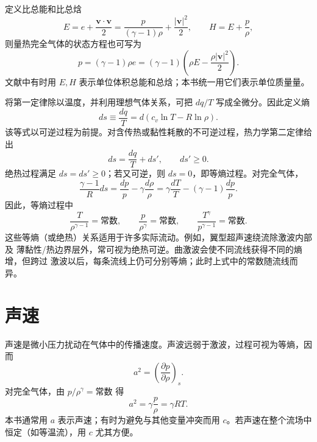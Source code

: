 \documentclass[11pt,a4paper,openany,fontset=none]{ctexbook}
\begin{document}
定义比总能和比总焓
\begin{equation}
 E=e+\frac{\bm v\cdot\bm v}{2}
   =\frac{p}{(\gamma-1)\rho}+\frac{\lvert\bm v\rvert^2}{2},
 \qquad H=E+\frac{p}{\rho},
\end{equation}
则量热完全气体的状态方程也可写为
\begin{equation}
 p=(\gamma-1)\rho e
  =(\gamma-1)\left(\rho E-\frac{\rho\lvert\bm v\rvert^2}{2}\right).
\end{equation}
文献中有时用 $E,H$ 表示单位体积总能和总焓；本书统一用它们表示单位质量量。

将第一定律除以温度，并利用理想气体关系，可把 $dq/T$ 写成全微分。因此定义熵
\begin{equation}
 ds\equiv\frac{dq}{T}
  =d\!\left(c_v\ln T-R\ln\rho\right).
\end{equation}
该等式以可逆过程为前提。对含传热或黏性耗散的不可逆过程，热力学第二定律给出
\begin{equation}
 ds=\frac{dq}{T}+ds',\qquad ds'\ge 0.
\end{equation}
绝热过程满足 $ds=ds'\ge0$；若又可逆，则 $ds=0$，即等熵过程。对完全气体，
\begin{equation}
 \frac{\gamma-1}{R}ds
 =\frac{dp}{p}-\gamma\frac{d\rho}{\rho}
 =\gamma\frac{dT}{T}-(\gamma-1)\frac{dp}{p}.
\end{equation}
因此，等熵过程中
\begin{equation}
 \frac{T}{\rho^{\gamma-1}}=\text{常数},\qquad
 \frac{p}{\rho^\gamma}=\text{常数},\qquad
 \frac{T^\gamma}{p^{\gamma-1}}=\text{常数}.
\end{equation}
这些等熵（或绝热）关系适用于许多实际流动。例如，翼型超声速绕流除激波内部及
薄黏性/热边界层外，常可视为绝热可逆。曲激波会使不同流线获得不同的熵增，但跨过
激波以后，每条流线上仍可分别等熵；此时上式中的常数随流线而异。

\section{声速}

声速是微小压力扰动在气体中的传播速度。声波远弱于激波，过程可视为等熵，因而
\begin{equation}
 a^2=\left(\frac{\partial p}{\partial\rho}\right)_s.
\end{equation}
对完全气体，由 $p/\rho^\gamma=\text{常数}$ 得
\begin{equation}
 a^2=\gamma\frac{p}{\rho}=\gamma RT.
\end{equation}
本书通常用 $a$ 表示声速；有时为避免与其他变量冲突而用 $c$。若声速在整个流场中
恒定（如等温流），用 $c$ 尤其方便。
\end{document}
